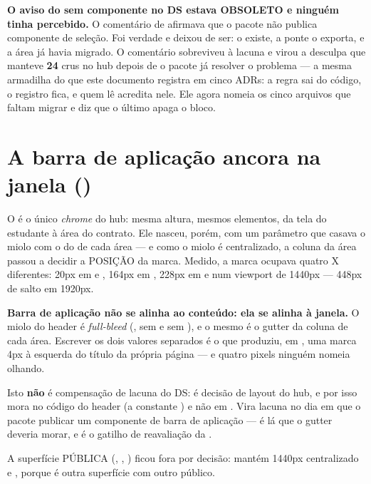 \begin{nota}
\textbf{O aviso do  sem componente no DS estava OBSOLETO e ninguém
tinha percebido.} O comentário de  afirmava que o pacote não
publica componente de seleção. Foi verdade e deixou de ser: o 
existe, a ponte o exporta, e a área  já havia migrado. O comentário
sobreviveu à lacuna e virou a desculpa que manteve \textbf{24} 
crus no hub depois de o pacote já resolver o problema --- a mesma armadilha do
 que este documento registra em cinco ADRs: a regra sai do
código, o registro fica, e quem lê acredita nele. Ele agora nomeia os cinco
arquivos que faltam migrar e diz que o último apaga o bloco.
\end{nota}

\section{A barra de aplicação ancora na janela ()}

O  é o único \emph{chrome} do hub: mesma altura, mesmos
elementos, da tela do estudante à área do contrato. Ele nasceu, porém, com um
parâmetro  que casava o miolo com o  do  de
cada área --- e como o miolo é centralizado, a coluna da área passou a decidir a
POSIÇÃO da marca. Medido, a marca ocupava quatro X diferentes: 20px em
 e , 164px em , 228px em  e
 num viewport de 1440px --- 448px de salto em 1920px.

\begin{atencao}
\textbf{Barra de aplicação não se alinha ao conteúdo: ela se alinha à janela.} O
miolo do header é \emph{full-bleed} (, sem  e sem
), e o mesmo  é o gutter da coluna de cada área. Escrever os
dois valores separados é o que produziu, em , uma marca 4px à
esquerda do título da própria página --- e quatro pixels ninguém nomeia olhando.
\end{atencao}

Isto \textbf{não} é compensação de lacuna do DS: é decisão de layout do hub, e
por isso mora no código do header (a constante ) e não em
. Vira lacuna no dia em que o pacote publicar um componente
de barra de aplicação --- é lá que o gutter deveria morar, e é o gatilho de
reavaliação da .

A superfície PÚBLICA (\cd{/}, , ) ficou fora por
decisão:  mantém 1440px centralizado e , porque é outra superfície com outro público.

